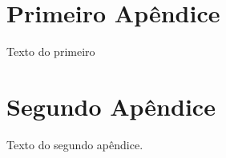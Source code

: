 \begin{apendicesenv}

\partapendices

\chapter{Primeiro Apêndice}

Texto do primeiro

\chapter{Segundo Apêndice}

Texto do segundo apêndice.

\end{apendicesenv}
